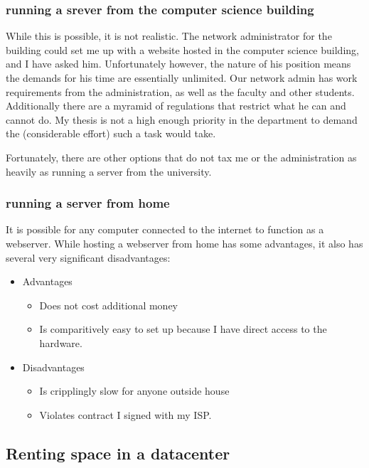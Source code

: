 {\subsubsection{running a srever from the computer science building}

While this is possible, it is not realistic.  The network administrator for the building could set me up with a website hosted in the computer science building, and I have asked him.  Unfortunately however, the nature of his position means the demands for his time are essentially unlimited.  Our network admin has work requirements from the administration, as well as the faculty and other students.  Additionally there are a myramid of regulations that restrict what he can and cannot do.  My thesis is not a high enough priority in the department to demand the (considerable effort) such a task would take.

Fortunately, there are other options that do not tax me or the administration as heavily as running a server from the university.


\subsubsection{running a server from home}

It is possible for any computer connected to the internet to function as a webserver.  While hosting a webserver from home has some advantages, it also has several very significant disadvantages:

\begin{itemize}
    \item Advantages
    \begin{itemize}
        \item Does not cost additional money
        \item Is comparitively easy to set up because I have direct access to the hardware.
    \end{itemize}
    \item Disadvantages
    \begin{itemize}
        \item Is cripplingly slow for anyone outside house
        \item Violates contract I signed with my ISP.
    \end{itemize}

\end{itemize}

\subsection{Renting space in a datacenter}

}

